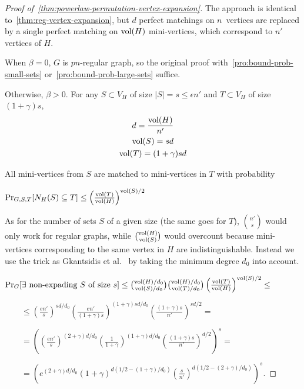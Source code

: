 \begin{proof}[Proof of~\autoref{thm:powerlaw-permutation-vertex-expansion}]
    \label{prf:powerlaw-permutation-vertex-expansion}
    The approach is identical to~\autoref{thm:reg-vertex-expansion},
    but $d$ perfect matchings on $n$~vertices
    are replaced by a single perfect matching on $\operatorname*{vol}(H)$ mini-vertices,
    which correspond to $n'$ vertices of $H$.
    
    When $\beta=0$, $G$ is $pn$-regular graph, so the original proof
    with~\autoref{pro:bound-prob-small-sets}
    or~\autoref{pro:bound-prob-large-sets} suffice.
    
    Otherwise, $\beta>0$.
    For any $S\subset V_H$ of size $|S|=s\leq\epsilon n'$
    and $T\subset V_H$ of size $(1+\gamma)s$,
    \begin{gather}
        d=\frac{\operatorname*{vol}(H)}{n'}\\
        \operatorname*{vol}(S)=sd\\
        \operatorname*{vol}(T)=(1+\gamma)sd
    \end{gather}
    
    All mini-vertices from $S$ are matched to mini-vertices in $T$ with probability
    
    $\Pr_{G,S,T}[N_H(S)\subseteq T]\leq\left(\frac{\operatorname*{vol}(T)}{\operatorname*{vol}(H)}\right)^{\operatorname*{vol}(S)/2}$
    
    As for the number of sets $S$ of a given size (the same goes for $T$),
    $\binom{n'}{s}$ would only work for regular graphs,
    while $\binom{\operatorname*{vol}(H)}{\operatorname*{vol}(S)}$ would overcount because mini-vertices
    corresponding to the same vertex in $H$ are indistinguishable.
    Instead we use the trick as Gkantsidis et al.~\cite{gms03} by taking
    the minimum degree $d_0$ into account.
    
    $\Pr_G[\exists\text{ non-expading }S\text{ of size }s]
    \leq\binom{\operatorname*{vol}(H)/d_0}{\operatorname*{vol}(S)/d_0}
    \binom{\operatorname*{vol}(H)/d_0}{\operatorname*{vol}(T)/d_0}
    \left(\frac{\operatorname*{vol}(T)}{\operatorname*{vol}(H)}\right)^{\operatorname*{vol}(S)/2}\leq$
    
    $\qquad\leq\left(\frac{en'}{s}\right)^{sd/d_0}
    \left(\frac{en'}{(1+\gamma)s}\right)^{(1+\gamma)sd/d_0}
    \left(\frac{(1+\gamma)s}{n'}\right)^{sd/2}=$
    
    $\qquad=\left(
        \left(\frac{en'}{s}\right)^{(2+\gamma)d/d_0}
        \left(\frac{1}{1+\gamma}\right)^{(1+\gamma)d/d_0}
        \left(\frac{(1+\gamma)s}{n'}\right)^{d/2}
    \right)^s=$
    
    $\qquad=\left(
        e^{(2+\gamma)d/d_0}
        (1+\gamma)^{d(1/2-(1+\gamma)/d_0)}
        \left(\frac{s}{n'}\right)^{d(1/2-(2+\gamma)/d_0)}
    \right)^s$.
    

\end{proof}
